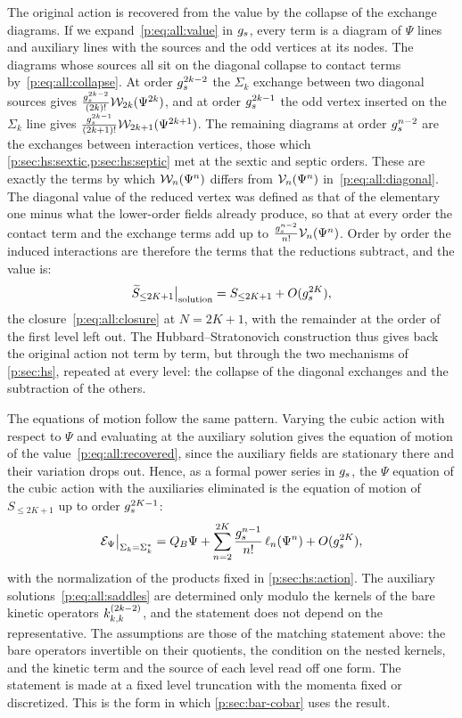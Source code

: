 The original action is recovered from the value by the collapse of the exchange diagrams.
If we expand~\eqref{p:eq:all:value} in $\gs$, every term is a diagram of $\Psi$ lines and auxiliary lines with the sources and the odd vertices at its nodes.
The diagrams whose sources all sit on the diagonal collapse to contact terms by~\eqref{p:eq:all:collapse}.
At order $\gs^{2 k - 2}$ the $\Sigma_k$ exchange between two diagonal sources gives $\tfrac{\gs^{2 k - 2}}{(2 k)!} \dvertex{2 k}(\Psi^{2 k})$, and at order $\gs^{2 k - 1}$ the odd vertex inserted on the $\Sigma_k$ line gives $\tfrac{\gs^{2 k - 1}}{(2 k + 1)!} \dvertex{2 k + 1}(\Psi^{2 k + 1})$.
The remaining diagrams at order $\gs^{n - 2}$ are the exchanges between interaction vertices, those which \cref{p:sec:hs:sextic,p:sec:hs:septic} met at the sextic and septic orders.
These are exactly the terms by which $\dvertex{n}(\Psi^n)$ differs from $\vertex{n}(\Psi^n)$ in~\eqref{p:eq:all:diagonal}.
The diagonal value of the reduced vertex was defined as that of the elementary one minus what the lower-order fields already produce, so that at every order the contact term and the exchange terms add up to $\tfrac{\gs^{n - 2}}{n!} \vertex{n}(\Psi^n)$.
Order by order the induced interactions are therefore the terms that the reductions subtract, and the value is:
\begin{equation}
  \label{p:eq:all:recovered}
  \caction[\le 2 K + 1] \big|_{\text{solution}}
    = S_{\le 2 K + 1} + O(\gs^{2 K}),
\end{equation}
the closure~\eqref{p:eq:all:closure} at $N = 2 K + 1$, with the remainder at the order of the first level left out.
The Hubbard--Stratonovich construction thus gives back the original action not term by term, but through the two mechanisms of \cref{p:sec:hs}, repeated at every level: the collapse of the diagonal exchanges and the subtraction of the others.

The equations of motion follow the same pattern.
Varying the cubic action with respect to $\Psi$ and evaluating at the auxiliary solution gives the equation of motion of the value~\eqref{p:eq:all:recovered}, since the auxiliary fields are stationary there and their variation drops out.
Hence, as a formal power series in $\gs$, the $\Psi$ equation of the cubic action with the auxiliaries eliminated is the equation of motion of $S_{\le 2 K + 1}$ up to order $\gs^{2 K - 1}$:
\begin{equation}
  \label{p:eq:all:eom-recovered}
  \mathcal E_\Psi \big|_{\Sigma_k = \Sigma_k^*}
    = Q_B \Psi + \sum_{n = 2}^{2 K} \frac{\gs^{n - 1}}{n!} \, \ell_n(\Psi^n) + O(\gs^{2 K}),
\end{equation}
with the normalization of the products fixed in \cref{p:sec:hs:action}.
The auxiliary solutions~\eqref{p:eq:all:saddles} are determined only modulo the kernels of the bare kinetic operators $\kin{k}{}{2 k - 2}$, and the statement does not depend on the representative.
The assumptions are those of the matching statement above: the bare operators invertible on their quotients, the condition on the nested kernels, and the kinetic term and the source of each level read off one form.
The statement is made at a fixed level truncation with the momenta fixed or discretized.
This is the form in which \cref{p:sec:bar-cobar} uses the result.

